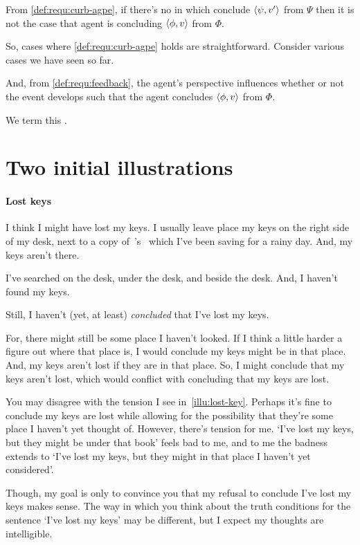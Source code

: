 \begin{note}
  From \ref{def:requ:curb-agpe}, if there's no \pevent{} in which conclude \(\langle \psi, v' \rangle\) from \(\Psi\) then it is not the case that agent is concluding \(\langle \phi, v \rangle\) from \(\Phi\).

  So, cases where \ref{def:requ:curb-agpe} holds are straightforward.
  Consider various cases we have seen so far.

  And, from \ref{def:requ:feedback}, the agent's perspective influences whether or not the event develops such that the agent concludes \(\langle \phi, v \rangle\) from \(\Phi\).

  We term this \feedback{}.
\end{note}

\section{Two initial illustrations}
\label{sec:two-init-illustr}

\paragraph{Lost keys}

\begin{note}
  \begin{scenario}
    \label{illu:lost-key}
    I think I might have lost my keys.
    I usually leave place my keys on the right side of my desk, next to a copy of~\citeauthor{Vickers:1989tr}'s~ which I've been saving for a rainy day.
    And, my keys aren't there.

    I've searched on the desk, under the desk, and beside the desk.
    And, I haven't found my keys.

    Still, I haven't (yet, at least) \emph{concluded} that I've lost my keys.

    For, there might still be some place I haven't looked.
    If I think a little harder a figure out where that place is, I would conclude my keys might be in that place.
    And, my keys aren't lost if they are in that place.
    So, I might conclude that my keys aren't lost, which would conflict with concluding that my keys are lost.
  \end{scenario}

  You may disagree with the tension I see in~\autoref{illu:lost-key}.
  Perhaps it's fine to conclude my keys are lost while allowing for the possibility that they're some place I haven't yet thought of.
  However, there's tension for me.
  `I've lost my keys, but they might be under that book' feels bad to me, and to me the badness extends to `I've lost my keys, but they might in that place I haven't yet considered'.

  Though, my goal is only to convince you that my refusal to conclude I've lost my keys makes sense.
  The way in which you think about the truth conditions for the sentence `I've lost my keys' may be different, but I expect my thoughts are intelligible.
\end{note}

